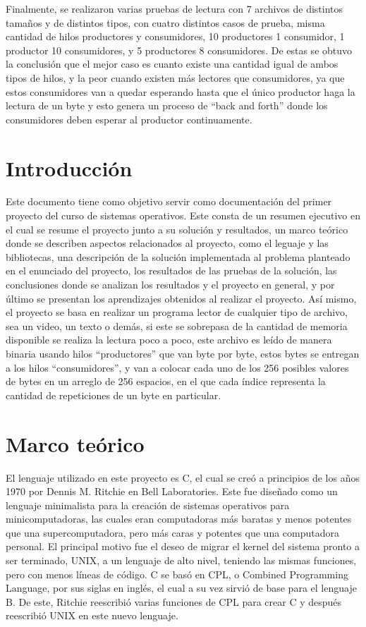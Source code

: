 \documentclass[12pt, article, natbib]{IEEEtran}
\begin{document}
Finalmente, se realizaron varias pruebas de lectura con 7 archivos de distintos tamaños y de distintos tipos, con cuatro distintos casos de prueba, misma cantidad de hilos productores y consumidores, 10 productores 1 consumidor, 1 productor 10 consumidores, y 5 productores 8 consumidores. De estas se obtuvo la conclusión que el mejor caso es cuanto existe una cantidad igual de ambos tipos de hilos, y la peor cuando existen más lectores que consumidores, ya que estos consumidores van a quedar esperando hasta que el único productor haga la lectura de un byte y esto genera un proceso de “back and forth” donde los consumidores deben esperar al productor continuamente.\\

\newpage
\twocolumn
\section{Introducción}
Este documento tiene como objetivo servir como documentación del primer proyecto del curso de sistemas operativos. Este consta de un resumen ejecutivo en el cual se resume el proyecto junto a su solución y resultados, un marco teórico donde se describen aspectos relacionados al proyecto, como el leguaje y las bibliotecas, una descripción de la solución implementada al problema planteado en el enunciado del proyecto, los resultados de las pruebas de la solución, las conclusiones donde se analizan los resultados y el proyecto en general, y por último se presentan los aprendizajes obtenidos al realizar el proyecto. Así mismo, el proyecto se basa en realizar un programa lector de cualquier tipo de archivo, sea un video, un texto o demás, si este se sobrepasa de la cantidad de memoria disponible se realiza la lectura poco a poco, este archivo es leído de manera binaria usando hilos “productores” que van byte por byte, estos bytes se entregan a los hilos “consumidores”, y van a colocar cada uno de los 256 posibles valores de bytes en un arreglo de 256 espacios, en el que cada índice representa la cantidad de repeticiones de un byte en particular.

\section{Marco teórico}
El lenguaje utilizado en este proyecto es C, el cual se creó a principios de los años 1970 por Dennis M. Ritchie en Bell Laboratories. Este fue diseñado como un lenguaje minimalista para la creación de sistemas operativos para minicomputadoras, las cuales eran computadoras más baratas y menos potentes que una supercomputadora, pero más caras y potentes que una computadora personal. El principal motivo fue el deseo de migrar el kernel del sistema pronto a ser terminado, UNIX, a un lenguaje de alto nivel, teniendo las mismas funciones, pero con menos líneas de código. C se basó en CPL, o Combined Programming Language, por sus siglas en inglés, el cual a su vez sirvió de base para el lenguaje B. De este, Ritchie reescribió varias funciones de CPL para crear C y después reescribió UNIX en este nuevo lenguaje.\cite{encyclopdiabritannica_2022_c} \cite{munoz_after}\\
\end{document}
